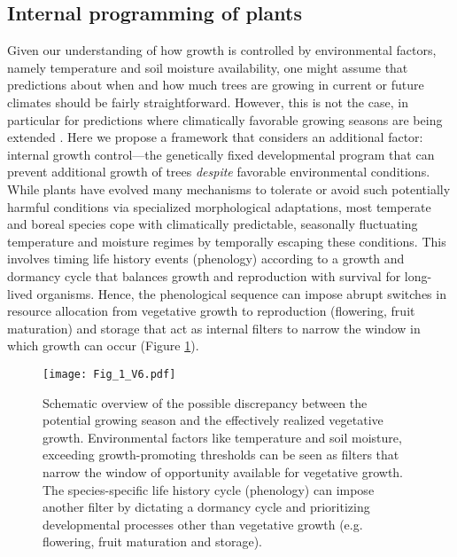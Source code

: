 \documentclass{article}
\begin{document}
		\subsection*{Internal programming of plants}
		Given our understanding of how growth is controlled by environmental factors, namely temperature and soil moisture availability, one might assume that predictions about when and how much trees are growing in current or future climates should be fairly straightforward. However, this is not the case, in particular for predictions where climatically favorable growing seasons are being extended \citep{zohnerHowChangesSpring2021}. Here we propose a framework that considers an additional factor: internal growth control---the genetically fixed developmental program that can prevent additional growth of trees \textit{despite} favorable environmental conditions.\\
		
		While plants have evolved many mechanisms to tolerate or avoid such potentially harmful conditions via specialized morphological adaptations, most temperate and boreal species cope with climatically predictable, seasonally fluctuating temperature and moisture regimes by temporally escaping these conditions. This involves timing life history events (phenology) according to a growth and dormancy cycle that balances growth and reproduction with survival for long-lived organisms. Hence, the phenological sequence can impose abrupt switches in resource allocation from vegetative growth to reproduction (flowering, fruit maturation) and storage \citep{stearnsTradeOffsLifeHistoryEvolution1989, chapinEcologyEconomicsStorage1990} that act as internal filters to narrow the window in which growth can occur (Figure \ref{fig:fig_1xxx}).\\
			
		
								\begin{figure}
								\centering
								\texttt{[image: Fig\_1\_V6.pdf]} 
								\caption{Schematic overview of the possible discrepancy between the potential growing season and the effectively realized vegetative growth. Environmental factors like temperature and soil moisture, exceeding growth-promoting thresholds can be seen as filters that narrow the window of opportunity available for vegetative growth. The species-specific life history cycle (phenology) can impose another filter by dictating a dormancy cycle and prioritizing developmental processes other than vegetative growth (e.g. flowering, fruit maturation and storage). }
								\label{fig:fig_1xxx}
							\end{figure}
\end{document}
